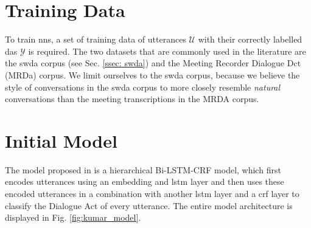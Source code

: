     
    
    \section{Training Data}
    To train \glspl{nn}, a set of training data of \glspl{utterance} $\mathcal{U}$ with their correctly labelled \glspl{da} $\mathcal{Y}$ is required. The two datasets that are commonly used in the literature are the \gls{swda} corpus (see Sec. \ref{ssec: swda}) and the Meeting Recorder Dialogue Dct (MRDa) corpus\cite{shriberg2004icsi}. We limit ourselves to the \gls{swda} corpus, because we believe the style of conversations in the \gls{swda} corpus to more closely resemble \textit{natural} conversations than the meeting transcriptions in the MRDA corpus.
    
    \section{Initial Model \label{method: kumar model}}
    The \gls{model} proposed in \cite{kumar2017dialogue} is a hierarchical Bi-LSTM-CRF \gls{model}, which first encodes \glspl{utterance} using an \gls{embedding} and \gls{lstm} layer and then uses these encoded \glspl{utterance} in a combination with another \gls{lstm} layer and a \gls{crf} layer to classify the Dialogue Act of every \gls{utterance}. The entire \gls{model} architecture is displayed in Fig. \ref{fig:kumar_model}.
    

